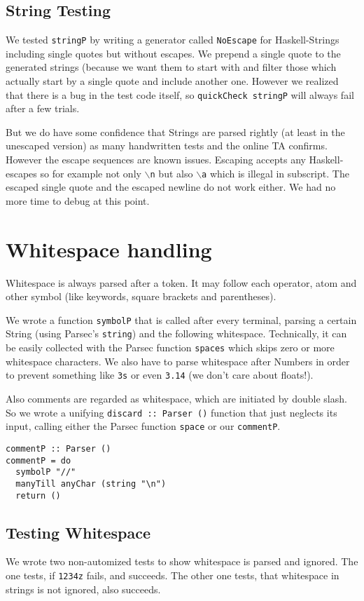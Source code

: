 \documentclass{article}
\begin{document}
\subsection{String Testing}
We tested \texttt{stringP} by writing a generator called \texttt{NoEscape} for Haskell-Strings including single quotes but without escapes.
We prepend a single quote to the generated strings (because we want them to start with  and filter those which actually start by a single quote and include another one.
However we realized that there is a bug in the test code itself, so \texttt{quickCheck stringP} will always fail after a few trials.

But we do have some confidence that Strings are parsed rightly (at least in the unescaped version) as many handwritten tests and the online TA confirms.
However the escape sequences are known issues. Escaping accepts any Haskell-escapes so for example not only \texttt{$\backslash$n} but also \texttt{$\backslash$a}
which is illegal in subscript. The escaped single quote and the escaped newline do not work either. We had no more time to debug at this point.

\section{Whitespace handling}
Whitespace is always parsed after a token. It may follow each operator, atom and other symbol (like keywords, square brackets and parentheses).

We wrote a function \texttt{symbolP} that is called after every terminal, parsing a certain String (using Parsec's \texttt{string}) and the following whitespace.
Technically, it can be easily collected with the Parsec function \texttt{spaces} which skips zero or more whitespace characters.
We also have to parse whitespace after Numbers in order to prevent something like \texttt{3s} or even \texttt{3.14} (we don't care about floats!).

Also comments are regarded as whitespace, which are initiated by double slash.
So we wrote a unifying \texttt{discard :: Parser ()} function that just neglects its input, calling either the Parsec function \texttt{space} or our \texttt{commentP}.

\begin{lstlisting}
commentP :: Parser ()
commentP = do
  symbolP "//"
  manyTill anyChar (string "\n")
  return ()
\end{lstlisting}

\subsection{Testing Whitespace}
We wrote two non-automized tests to show whitespace is parsed and ignored.
The one tests, if \texttt{1234z} fails, and succeeds.
The other one tests, that whitespace in strings is not ignored, also succeeds.
\end{document}
